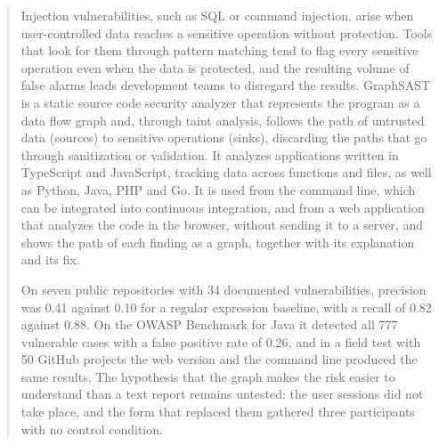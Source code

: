 
\begin{abstract}

Injection vulnerabilities, such as SQL or command injection, arise when
user-controlled data reaches a sensitive operation without protection.
Tools that look for them through pattern matching tend to flag every
sensitive operation even when the data is protected, and the resulting
volume of false alarms leads development teams to disregard the results.
GraphSAST is a static source code security analyzer that represents the
program as a data flow graph and, through taint analysis, follows the
path of untrusted data (sources) to sensitive operations (sinks),
discarding the paths that go through sanitization or validation. It
analyzes applications written in TypeScript and JavaScript, tracking data
across functions and files, as well as Python, Java, PHP and Go. It is
used from the command line, which can be integrated into continuous
integration, and from a web application that analyzes the code in the
browser, without sending it to a server, and shows the path of each
finding as a graph, together with its explanation and its fix.

On seven public repositories with 34 documented vulnerabilities,
precision was 0.41 against 0.10 for a regular expression baseline, with
a recall of 0.82 against 0.88. On the OWASP Benchmark for Java it
detected all 777 vulnerable cases with a false positive rate of 0.26,
and in a field test with 50 GitHub projects the web version and the
command line produced the same results. The hypothesis that the graph
makes the risk easier to understand than a text report remains
untested: the user sessions did not take place, and the form that
replaced them gathered three participants with no control condition.

\end{abstract}
